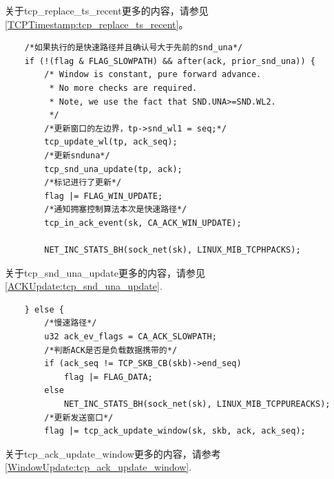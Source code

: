     关于tcp\_replace\_ts\_recent更多的内容，请参见\ref{TCPTimestamp:tcp_replace_ts_recent}。

\begin{verbatim}
    /*如果执行的是快速路径并且确认号大于先前的snd_una*/
    if (!(flag & FLAG_SLOWPATH) && after(ack, prior_snd_una)) {
        /* Window is constant, pure forward advance.
         * No more checks are required.
         * Note, we use the fact that SND.UNA>=SND.WL2.
         */
        /*更新窗口的左边界，tp->snd_wl1 = seq;*/
        tcp_update_wl(tp, ack_seq);
        /*更新snduna*/
        tcp_snd_una_update(tp, ack);
        /*标记进行了更新*/
        flag |= FLAG_WIN_UPDATE;
        /*通知拥塞控制算法本次是快速路径*/
        tcp_in_ack_event(sk, CA_ACK_WIN_UPDATE);

        NET_INC_STATS_BH(sock_net(sk), LINUX_MIB_TCPHPACKS);
\end{verbatim}

    关于tcp\_snd\_una\_update更多的内容，请参见\ref{ACKUpdate:tcp_snd_una_update}.

\begin{verbatim}
    } else {
        /*慢速路径*/
        u32 ack_ev_flags = CA_ACK_SLOWPATH;
        /*判断ACK是否是负载数据携带的*/
        if (ack_seq != TCP_SKB_CB(skb)->end_seq)
            flag |= FLAG_DATA;
        else
            NET_INC_STATS_BH(sock_net(sk), LINUX_MIB_TCPPUREACKS);
        /*更新发送窗口*/
        flag |= tcp_ack_update_window(sk, skb, ack, ack_seq);
\end{verbatim}

    关于tcp\_ack\_update\_window更多的内容，请参考\ref{WindowUpdate:tcp_ack_update_window}.

